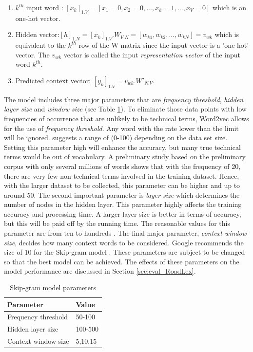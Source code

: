 \documentclass[Journal, BackFigs, DoubleSpace]{ascelike}%
\begin{document}
%
\begin{enumerate}
	\item $k^{th}$ input word : $[x_k]_{1.V} = [x_1=0, x_2=0,...,x_k=1,..., x_V=0]$ which is an one-hot vector.
	\item Hidden vector:$[h]_{1.N} = [x_k]_{1.V}.W_{V.N} = [w_{k1},w_{k2},..., w_{kN}]= v_{wk}$ which is equivalent to the $k^{th}$ row of the W matrix since the input vector is a 'one-hot' vector. The $v_{wk}$ vector is called the input \textit{representation vector} of the input word $k^{th}$.
	\item Predicted context vector: $[y_k]_{1.V} = v_{wk}.W'_{N.V}$. 
\end{enumerate}
%
\par
The model includes three major parameters that are \textit{frequency threshold}, \textit{hidden layer size} and \textit{window size} (see Table \ref{table:nn-parameters}). To eliminate those data points with low frequencies of occurrence that are unlikely to be technical terms, Word2vec allows for the use of \textit{frequency threshold}. Any word with the rate lower than the limit will be ignored.  suggests a range of (0-100) depending on the data set size. Setting this parameter high will enhance the accuracy, but many true technical terms would be out of vocabulary. A preliminary study based on the preliminary corpus with only several millions of words shows that with the frequency of 20, there are very few non-technical terms involved in the training dataset. Hence, with the larger dataset to be collected, this parameter can be higher and up to around 50. The second important parameter is \textit{layer size} which determines the number of nodes in the hidden layer. This parameter highly affects the training accuracy and processing time. A larger layer size is better in terms of accuracy, but this will be paid off by the running time. The reasonable values for this parameter are from ten to hundreds \cite{rehurek14}. The final major parameter, \textit{context window size}, decides how many context words to be considered. Google recommends the size of 10 for the Skip-gram model \cite{google2016}. These parameters are subject to be changed so that the best model can be achieved. The effects of these parameters on the model performance are discussed in Section \ref{sec:eval_RoadLex}.
%
\begin{table} [t]
	\caption{Skip-gram model parameters}
	\label{table:nn-parameters}
	\centering
	\small
	\renewcommand{\arraystretch}{1.25}
	\begin{tabular}{l l}
		\hline
		\textbf{Parameter} & \textbf{Value}\\
		\hline
		Frequency threshold & 50-100\\
		Hidden layer size		&	100-500\\
		Context window size	&	5,10,15\\
		\hline
	\end{tabular}
	\normalsize
\end{table}
\end{document}
